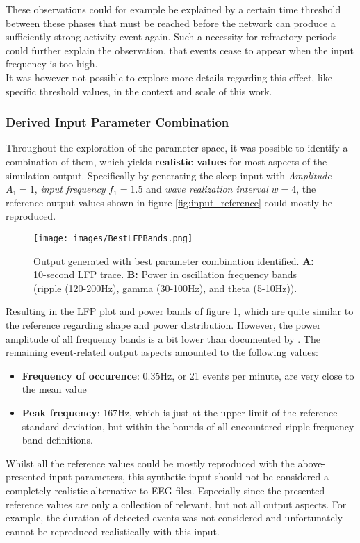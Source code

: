         These observations could for example be explained by a certain time threshold between these phases that must be reached before the network can produce a sufficiently strong activity event again. Such a necessity for refractory periods could further explain the observation,  that events cease to appear when the input frequency is too high.\\
        It was however not possible to explore more details regarding this effect, like specific threshold values, in the context and scale of this work.



        \subsubsection{Derived Input Parameter Combination}
        Throughout the exploration of the parameter space, it was possible to identify a combination of them, which yields \textbf{realistic values} for most aspects of the simulation output. Specifically by generating the sleep input with \textit{Amplitude} \(A_1 = 1\), \textit{input frequency} \(f_1 = 1.5\) and \textit{wave realization interval} \(w = 4\), the reference output values shown in figure \ref{fig:input_reference} could mostly be reproduced.
        \begin{figure}[htbp]
            \centering
            \texttt{[image: images/BestLFPBands.png]}
            \caption{Output generated with best parameter combination identified. \textbf{A:} 10-second LFP trace. \textbf{B:} Power in oscillation frequency bands (ripple (120-200Hz), gamma (30-100Hz), and theta (5-10Hz)).}
            \label{fig:best-input-plots}
        \end{figure}
        Resulting in the LFP plot and power bands of figure \ref{fig:best-input-plots}, which are quite similar to the reference regarding shape and power distribution. However, the power amplitude of all frequency bands is a bit lower than documented by \textcite{Aussel.2018}. The remaining event-related output aspects amounted to the following values:
        \begin{itemize}
            \item \textbf{Frequency of occurence}: 0.35Hz, or 21 events per minute, are very close to the mean value
            \item \textbf{Peak frequency}: 167Hz, which is just at the upper limit of the reference standard deviation, but within the bounds of all encountered ripple frequency band definitions.
        \end{itemize}
        Whilst all the reference values could be mostly reproduced with the above-presented input parameters, this synthetic input should not be considered a completely realistic alternative to EEG files. Especially since the presented reference values are only a collection of relevant, but not all output aspects. For example, the duration of detected events was not considered and unfortunately cannot be reproduced realistically with this input.
        
